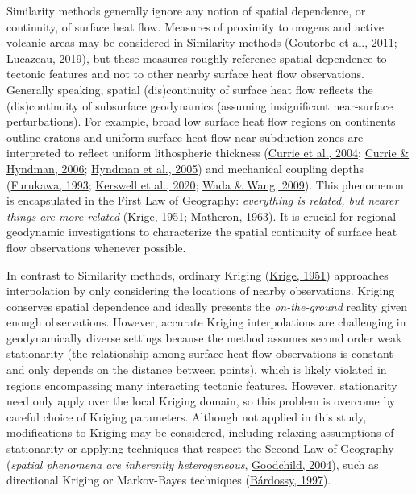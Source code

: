 Similarity methods generally ignore any notion of spatial dependence, or continuity, of surface heat flow. Measures of proximity to orogens and active volcanic areas may be considered in Similarity methods (\protect\hyperlink{ref-goutorbe2011}{Goutorbe et al., 2011}; \protect\hyperlink{ref-lucazeau2019}{Lucazeau, 2019}), but these measures roughly reference spatial dependence to tectonic features and not to other nearby surface heat flow observations. Generally speaking, spatial (dis)continuity of surface heat flow reflects the (dis)continuity of subsurface geodynamics (assuming insignificant near-surface perturbations). For example, broad low surface heat flow regions on continents outline cratons and uniform surface heat flow near subduction zones are interpreted to reflect uniform lithospheric thickness (\protect\hyperlink{ref-currie2004}{Currie et al., 2004}; \protect\hyperlink{ref-currie2006}{Currie \& Hyndman, 2006}; \protect\hyperlink{ref-hyndman2005}{Hyndman et al., 2005}) and mechanical coupling depths (\protect\hyperlink{ref-furukawa1993}{Furukawa, 1993}; \protect\hyperlink{ref-kerswell2020}{Kerswell et al., 2020}; \protect\hyperlink{ref-wada2009}{Wada \& Wang, 2009}). This phenomenon is encapsulated in the First Law of Geography: \emph{everything is related, but nearer things are more related} (\protect\hyperlink{ref-krige1951}{Krige, 1951}; \protect\hyperlink{ref-matheron1963}{Matheron, 1963}). It is crucial for regional geodynamic investigations to characterize the spatial continuity of surface heat flow observations whenever possible.

In contrast to Similarity methods, ordinary Kriging (\protect\hyperlink{ref-krige1951}{Krige, 1951}) approaches interpolation by only considering the locations of nearby observations. Kriging conserves spatial dependence and ideally presents the \emph{on-the-ground} reality given enough observations. However, accurate Kriging interpolations are challenging in geodynamically diverse settings because the method assumes second order weak stationarity (the relationship among surface heat flow observations is constant and only depends on the distance between points), which is likely violated in regions encompassing many interacting tectonic features. However, stationarity need only apply over the local Kriging domain, so this problem is overcome by careful choice of Kriging parameters. Although not applied in this study, modifications to Kriging may be considered, including relaxing assumptions of stationarity or applying techniques that respect the Second Law of Geography (\emph{spatial phenomena are inherently heterogeneous}, \protect\hyperlink{ref-goodchild2004}{Goodchild, 2004}), such as directional Kriging or Markov-Bayes techniques (\protect\hyperlink{ref-bardossy1997}{Bárdossy, 1997}).

